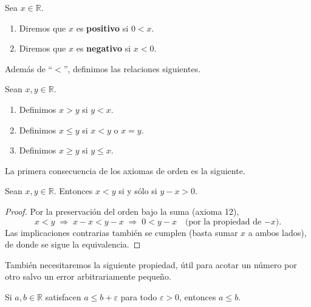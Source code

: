 \documentclass[12pt,a4paper]{book}
\begin{document}
  \begin{definicion}
    Sea $x \in \mathbb{R}$.
    \begin{enumerate}[label=(\alph*)]
      \item Diremos que $x$ es \textbf{positivo} si $0<x$.
      \item Diremos que $x$ es \textbf{negativo} si $x<0$.
    \end{enumerate}
  \end{definicion}
  
  Además de ``$<$'', definimos las relaciones siguientes.
  
  \begin{definicion}
    Sean $x,y \in \mathbb{R}$.
    \begin{enumerate}[label=(\alph*)]
      \item Definimos $x>y$ si $y<x$.
      \item Definimos $x \leq y$ si $x<y$ o $x=y$.
      \item Definimos $x \geq y$ si $y \leq x$.
    \end{enumerate}
  \end{definicion}
  
  La primera consecuencia de los axiomas de orden es la siguiente.
  
  \begin{proposicion}
    Sean $x,y \in \mathbb{R}$. Entonces $x<y$ si y sólo si $y-x>0$.
  \end{proposicion}
  
  \begin{proof}
    Por la preservación del orden bajo la suma (axioma 12),
    \begin{equation*}
      x<y \;\Rightarrow\; x-x < y-x \;\Rightarrow\; 0<y-x \quad \text{(por la propiedad de $-x$).}
    \end{equation*}
    Las implicaciones contrarias también se cumplen (basta sumar $x$ a ambos lados), de donde se sigue la equivalencia.
  \end{proof}
  
  También necesitaremos la siguiente propiedad, útil para acotar un número por otro salvo un error arbitrariamente pequeño.
  
  \begin{proposicion}
    Si $a,b \in \mathbb{R}$ satisfacen $a \leq b+\varepsilon$ para todo $\varepsilon>0$, entonces $a \leq b$.
  \end{proposicion}
  
\end{document}
